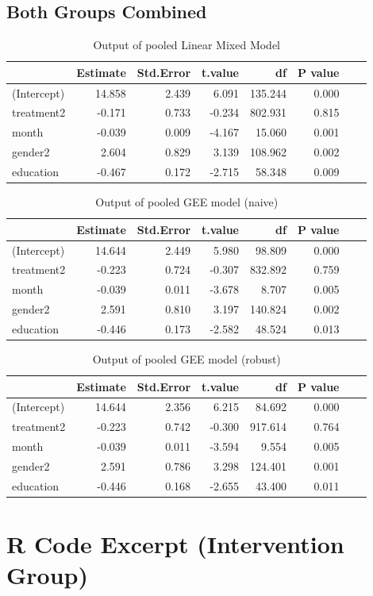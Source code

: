 \subsection{Both Groups Combined}

\begin{table}[H]
\centering
\begin{tabular}{|l|r|r|r|r|r|r|r|}
\hline
  & Estimate & Std.Error & t.value & df & P value\\
\hline
(Intercept) & 14.858 & 2.439 & 6.091 & 135.244 & 0.000 \\
\hline
treatment2 & -0.171 & 0.733 & -0.234 & 802.931 & 0.815 \\
\hline
month & -0.039 & 0.009 & -4.167 & 15.060 & 0.001 \\
\hline
gender2 & 2.604 & 0.829 & 3.139 & 108.962 & 0.002 \\
\hline
education & -0.467 & 0.172 & -2.715 & 58.348 & 0.009 \\
\hline
\end{tabular}
\caption{Output of pooled Linear Mixed Model}
\label{tab:lme.mi}
\end{table}

\begin{table}[H]
\centering
\begin{tabular}{|l|r|r|r|r|r|r|r|}
\hline
  & Estimate & Std.Error & t.value & df & P value\\
\hline
(Intercept) & 14.644 & 2.449 & 5.980 & 98.809 & 0.000 \\
\hline
treatment2 & -0.223 & 0.724 & -0.307 & 832.892 & 0.759 \\
\hline
month & -0.039 & 0.011 & -3.678 & 8.707 & 0.005 \\
\hline
gender2 & 2.591 & 0.810 & 3.197 & 140.824 & 0.002 \\
\hline
education & -0.446 & 0.173 & -2.582 & 48.524 & 0.013 \\
\hline
\end{tabular}
\caption{Output of pooled GEE model (naive)}
\label{tab:gee.mi.naive}
\end{table}

\begin{table}[H]
\centering
\begin{tabular}{|l|r|r|r|r|r|r|r|}
\hline
  & Estimate & Std.Error & t.value & df & P value\\
\hline
(Intercept) & 14.644 & 2.356 & 6.215 & 84.692 & 0.000 \\
\hline
treatment2 & -0.223 & 0.742 & -0.300 & 917.614 & 0.764 \\
\hline
month & -0.039 & 0.011 & -3.594 & 9.554 & 0.005 \\
\hline
gender2 & 2.591 & 0.786 & 3.298 & 124.401 & 0.001 \\
\hline
education & -0.446 & 0.168 & -2.655 & 43.400 & 0.011 \\
\hline
\end{tabular}
\caption{Output of pooled GEE model (robust)}
\label{tab:gee.mi.robust}
\end{table}

\section{R Code Excerpt (Intervention Group)}
